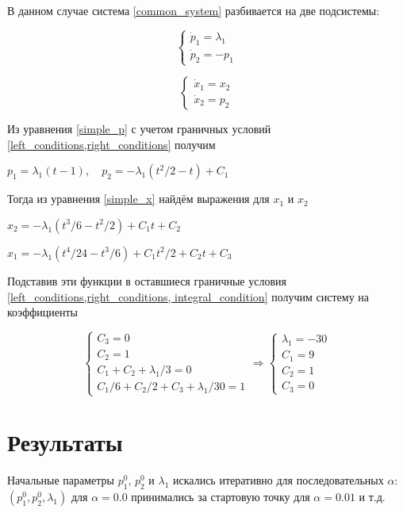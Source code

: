 \documentclass[a4paper,12pt]{article}
\begin{document}
В данном случае система \cref{common_system} разбивается на две подсистемы:

\begin{equation}
  \label{simple_p}
  \begin{cases}
    \dot{p}_1=\lambda_1\\
    \dot{p}_2=-p_1
  \end{cases}
\end{equation}

\begin{equation}
  \label{simple_x}
  \begin{cases}
    \dot{x}_1=x_2\\
    \dot{x}_2=p_2
  \end{cases}
\end{equation}

Из уравнения \cref{simple_p} с учетом граничных условий \cref{left_conditions,right_conditions} получим

\(p_1=\lambda_1(t-1), \quad p_2=-\lambda_1\left(t^2/2-t\right)+C_1\)

Тогда из уравнения \cref{simple_x} найдём выражения для \(x_1\) и \(x_2\)

\(x_2=-\lambda_1\left(t^3/6-t^2/2\right)+C_1 t +C_2\)

\(x_1=-\lambda_1\left(t^4/24-t^3/6\right)+C_1 t^2/2 +C_2 t+ C_3\)

Подставив эти функции в оставшиеся граничные условия \cref{left_conditions,right_conditions, integral_condition} получим систему на коэффициенты

\begin{equation*}
  \begin{cases}
    C_3=0\\
    C_2=1\\
    C_1+C_2+\lambda_1/3=0\\
    C_1/6+C_2/2+C_3+\lambda_1/30=1
  \end{cases}
  \Rightarrow
  \begin{cases}
    \lambda_1=-30\\
    C_1=9\\
    C_2=1\\
    C_3=0
  \end{cases}
\end{equation*}

\section*{Результаты}
Начальные параметры \(p_1^0\), \(p_2^0\) и \(\lambda_1\) искались итеративно для последовательных \(\alpha\): \(\left(p_1^0, p_2^0, \lambda_1\right)\) для \(\alpha=0.0\) принимались за стартовую точку для \(\alpha=0.01\) и т.д. 
\end{document}
